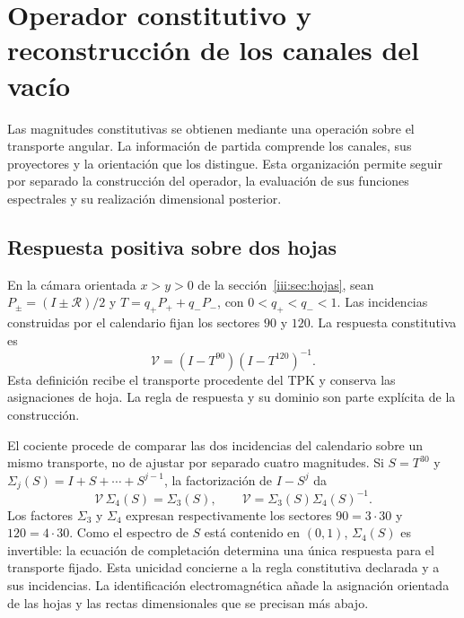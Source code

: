 \section{Operador constitutivo y reconstrucción de los canales del vacío}
\label{iii:sec:constitutiva}

Las magnitudes constitutivas se obtienen mediante una operación sobre el
transporte angular. La información de partida comprende los canales, sus
proyectores y la orientación que los distingue. Esta organización permite
seguir por separado la construcción del operador, la evaluación de sus
funciones espectrales y su realización dimensional posterior.

\subsection{Respuesta positiva sobre dos hojas}

En la cámara orientada $x>y>0$ de la sección~\ref{iii:sec:hojas}, sean
$P_\pm=(I\pm\mathcal R)/2$ y
$T=q_+P_++q_-P_-$, con $0<q_+<q_-<1$. Las incidencias construidas por el
calendario fijan los sectores $90$ y $120$. La respuesta constitutiva es
\begin{equation}
 \mathcal V=(I-T^{90})(I-T^{120})^{-1}.
 \label{iii:eq:vacuum-op}
\end{equation}
Esta definición recibe el transporte procedente del TPK y conserva las
asignaciones de hoja. La regla de respuesta y su dominio son parte explícita
de la construcción.

El cociente procede de comparar las dos incidencias del calendario sobre
un mismo transporte, no de ajustar por separado cuatro magnitudes. Si
$S=T^{30}$ y $\Sigma_j(S)=I+S+\cdots+S^{j-1}$, la factorización de
$I-S^j$ da
\begin{equation}
 \mathcal V\,\Sigma_4(S)=\Sigma_3(S),\qquad
 \mathcal V=\Sigma_3(S)\Sigma_4(S)^{-1}.
 \label{iii:eq:completion-response}
\end{equation}
Los factores $\Sigma_3$ y $\Sigma_4$ expresan respectivamente los
sectores $90=3\cdot30$ y $120=4\cdot30$. Como el espectro de $S$ está
contenido en $(0,1)$, $\Sigma_4(S)$ es invertible: la ecuación de
completación determina una única respuesta para el transporte fijado.
Esta unicidad concierne a la regla constitutiva declarada y a sus
incidencias. La identificación electromagnética añade la asignación
orientada de las hojas y las rectas dimensionales que se precisan más
abajo.


